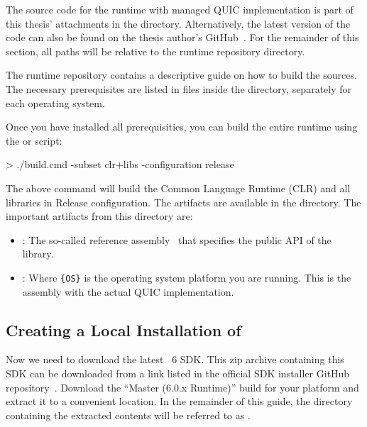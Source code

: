 The source code for the \dotnet{} runtime with managed QUIC implementation is part of this thesis'
attachments in the  directory. Alternatively, the latest version of the
code can also be found on the thesis author's GitHub~\cite{githubRzikmRuntimelab}. For the remainder
of this section, all paths will be relative to the \dotnet{} runtime repository directory.

The \dotnet{} runtime repository contains a descriptive guide on how to build the sources. The
necessary prerequisites are listed in files inside the 
directory, separately for each operating system.

Once you have installed all prerequisities, you can build the entire \dotnet{} runtime using the
 or  script:

\begin{myVerbatim}
> ./build.cmd -subset clr+libs -configuration release
\end{myVerbatim}

The above command will build the Common Language Runtime (CLR) and all libraries in Release
configuration. The artifacts are available in the 
directory. The important artifacts from this directory are:

\begin{itemize}

  \item {}: The so-called reference
assembly~\cite{ReferenceAssemblyDocs} that specifies the public API of the library.

  \item {}: Where \verb|{OS}| is the operating
system platform you are running. This is the \dotnet{} assembly with the actual QUIC implementation.

\end{itemize}

\subsection{Creating a Local Installation of \dotnet{}}\label{sec:06-local-dotnet}

Now we need to download the latest \dotnet{}~6 SDK\@. This zip archive containing this SDK can be
downloaded from a link listed in the official SDK installer GitHub
repository~\cite{dotnetSdkGithub}. Download the ``Master (6.0.x Runtime)'' build for your platform
and extract it to a convenient location. In the remainder of this guide, the directory containing
the extracted contents will be referred to as .

